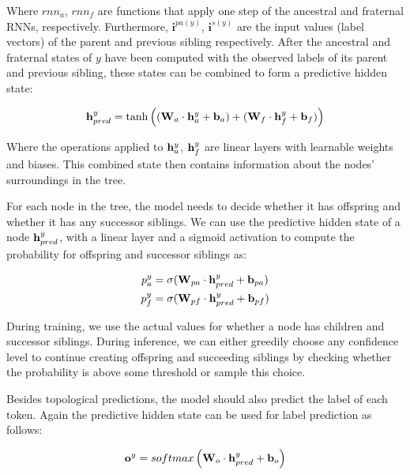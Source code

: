 Where $rnn_a$, $rnn_f$ are functions that apply one step of the ancestral and fraternal RNNs, respectively. Furthermore, $\mathbf{i}^{pa(y)}$, $\mathbf{i}^{s(y)}$ are the input values (label vectors) of the parent and previous sibling respectively. After the ancestral and fraternal states of $y$ have been computed with the observed labels of its parent and previous sibling, these states can be combined to form a predictive hidden state:

\begin{align}
    \mathbf{h}^y_{pred} = \tanh\left((\mathbf{W}_a \cdot \mathbf{h}_a^y + \mathbf{b}_a) + (\mathbf{W}_f \cdot \mathbf{h}_f^y + \mathbf{b}_f)\right)
\end{align}

Where the operations applied to $\mathbf{h}_a^y$, $\mathbf{h}_f^y$ are linear layers with learnable weights and biases. This combined state then contains information about the nodes' surroundings in the tree.



For each node in the tree, the model needs to decide whether it has offspring and whether it has any successor siblings. We can use the predictive hidden state of a node $\mathbf{h}^y_{pred}$, with a linear layer and a sigmoid activation to compute the probability for offspring and successor siblings as:

\begin{align}
    p_a^y &= \sigma(\mathbf{W}_{pa} \cdot \mathbf{h}_{pred}^y + \mathbf{b}_{pa}) \label{eq:prob_ancestral} \\
    p_f^y &= \sigma(\mathbf{W}_{pf} \cdot \mathbf{h}_{pred}^y + \mathbf{b}_{pf})\label{eq:prob_fraternal}
\end{align}

During training, we use the actual values for whether a node has children and successor siblings. 
During inference, we can either greedily choose any confidence level to continue creating offspring and succeeding siblings by checking whether the probability is above some threshold or sample this choice. 



Besides topological predictions, the model should also predict the label of each token. Again the predictive hidden state can be used for label prediction as follows:

\begin{align}
    \mathbf{o}^y =  softmax\left(\mathbf{W}_o \cdot \mathbf{h}_{pred}^y + \mathbf{b}_{o}\right) \label{eq:label_pred}
\end{align}


